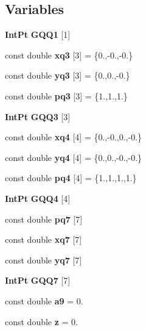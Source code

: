 \subsection*{Variables}
\begin{DoxyCompactItemize}
\item 
{\bf Int\-Pt} {\bfseries G\-Q\-Q1} [1]
\item 
const double {\bfseries xq3} [3] = \{0.,-\/0.,-\/0.\}\label{GaussQuadratureQuad_8cc_a427ba3b88c752a2cf34adf4b5cf026e6}

\item 
const double {\bfseries yq3} [3] = \{0.,0.,-\/0.\}\label{GaussQuadratureQuad_8cc_ae527a7b0ef9c700479e0b5ecdfc4398d}

\item 
const double {\bfseries pq3} [3] = \{1.,1.,1.\}\label{GaussQuadratureQuad_8cc_ac51516c4c929cec0fc29f583acba9f63}

\item 
{\bf Int\-Pt} {\bfseries G\-Q\-Q3} [3]
\item 
const double {\bfseries xq4} [4] = \{0.,-\/0.,0.,-\/0.\}\label{GaussQuadratureQuad_8cc_a3fd943929e534a1c2512b817949fae78}

\item 
const double {\bfseries yq4} [4] = \{0.,0.,-\/0.,-\/0.\}\label{GaussQuadratureQuad_8cc_a0718857d38640a1a036f9d10bc21ee59}

\item 
const double {\bfseries pq4} [4] = \{1.,1.,1.,1.\}\label{GaussQuadratureQuad_8cc_acbbe9a1dc5267a9e5e466a1a9fb1e221}

\item 
{\bf Int\-Pt} {\bfseries G\-Q\-Q4} [4]
\item 
const double {\bfseries pq7} [7]
\item 
const double {\bfseries xq7} [7]
\item 
const double {\bfseries yq7} [7]
\item 
{\bf Int\-Pt} {\bfseries G\-Q\-Q7} [7]
\item 
const double {\bfseries a9} = 0.\label{GaussQuadratureQuad_8cc_a10f785f45d977c9373bd2c9235bf8ea0}

\item 
const double {\bfseries z} = 0.\label{GaussQuadratureQuad_8cc_a923337b333ce340581179d1d05edc238}


\end{DoxyCompactItemize}

